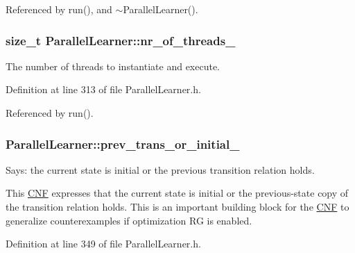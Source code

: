Referenced by run(), and $\sim$\-Parallel\-Learner().

\hypertarget{classParallelLearner_a170a0abad017845877039684507e7a66}{
\subsubsection[{nr\-\_\-of\-\_\-threads\-\_\-}]{\setlength{\rightskip}{0pt plus 5cm}size\-\_\-t Parallel\-Learner\-::nr\-\_\-of\-\_\-threads\-\_\-\hspace{0.3cm}{\ttfamily [protected]}}}\label{classParallelLearner_a170a0abad017845877039684507e7a66}


The number of threads to instantiate and execute. 



Definition at line 313 of file Parallel\-Learner.\-h.



Referenced by run().

\hypertarget{classParallelLearner_ac73d9338262855f61f23a65d1df0647c}{
\subsubsection[{prev\-\_\-trans\-\_\-or\-\_\-initial\-\_\-}]{ Parallel\-Learner\-::prev\-\_\-trans\-\_\-or\-\_\-initial\-\_\-\hspace{0.3cm}{\ttfamily [protected]}}}\label{classParallelLearner_ac73d9338262855f61f23a65d1df0647c}


Says\-: the current state is initial or the previous transition relation holds. 

This \hyperlink{classCNF}{C\-N\-F} expresses that the current state is initial or the previous-\/state copy of the transition relation holds. This is an important building block for the \hyperlink{classCNF}{C\-N\-F} to generalize counterexamples if optimization R\-G is enabled. 

Definition at line 349 of file Parallel\-Learner.\-h.



